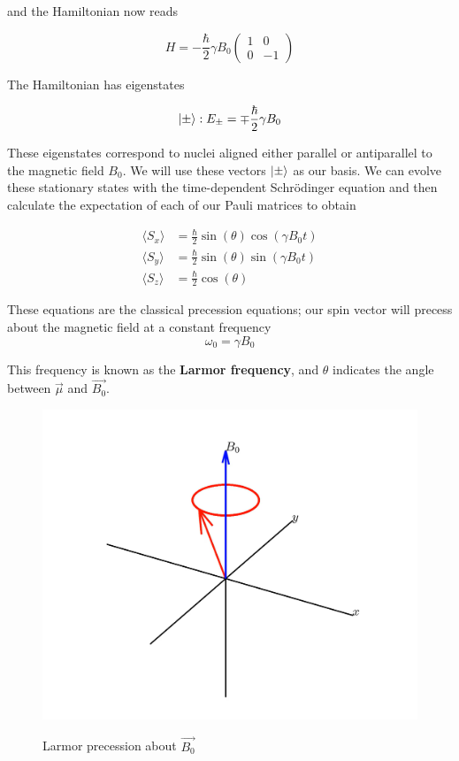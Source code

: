 \documentclass[
    floatfix,  %
    reprint,
    amsmath,
    amssymb,
    aps,
]{revtex4-2}
\DeclarePairedDelimiter\ket{\lvert}{\rangle}
\newcommand{\pauliz}{
    \begin{pmatrix}
        1 & 0 \\
        0 & -1
\end{pmatrix}}
\begin{document}
and the Hamiltonian now reads

\begin{equation}\label{eqn:hamiltonian}
    H = -\frac{\hbar}{2} \gamma B_0  \pauliz
\end{equation}

The Hamiltonian has eigenstates

\begin{equation}
    \ket{\pm} : E_\pm = \mp \frac{\hbar}{2} \gamma B_0
\end{equation}

These eigenstates correspond to nuclei aligned either parallel or antiparallel to the magnetic field $B_0$. We will use these vectors $\ket{\pm}$ as our basis. We can evolve these stationary states with the time-dependent Schr\"odinger equation and then calculate the expectation of each of our Pauli matrices to obtain

\begin{align*}
    \langle S_x \rangle &= \frac{\hbar}{2} \sin(\theta)\cos(\gamma B_0 t)\\
    \langle S_y \rangle &= \frac{\hbar}{2} \sin(\theta)\sin(\gamma B_0 t)\\
    \langle S_z \rangle &= \frac{\hbar}{2} \cos(\theta)
\end{align*}

These equations are the classical precession equations; our spin vector will precess about the magnetic field at a constant frequency
\begin{equation}
    \omega_0 = \gamma B_0
\end{equation}

This frequency is known as the \textbf{Larmor frequency}, and $\theta$ indicates the angle between $\vec{\mu}$ and $\vec{B_0}$. \cite{griffiths}

\begin{figure}[htbp]
    \centering
    {\includegraphics[width = 0.6\linewidth]{figs/larmor-precession.png}}
    \caption{Larmor precession about $\vec{B_0}$}
\end{figure}
\end{document}
